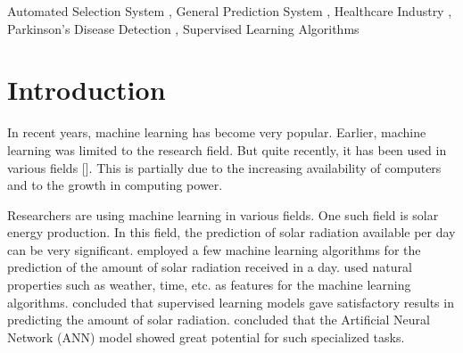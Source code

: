 \documentclass[a4paper,fleqn]{cas-dc}
\begin{document}


\begin{keywords}
    Automated Selection System \sep
    General Prediction System \sep
    Healthcare Industry \sep
    Parkinson's Disease Detection \sep
    Supervised Learning Algorithms
\end{keywords}


\maketitle



\section{Introduction}\label{sec:introduciton}

In recent years, machine learning has become very popular. Earlier, machine learning was limited to the research field. But quite recently, it has been used in various fields []. This is partially due to the increasing availability of computers and to the growth in computing power.

Researchers are using machine learning in various fields. One such field is solar energy production. In this field, the prediction of solar radiation available per day can be very significant. \cite*{ref_paper_7} employed a few machine learning algorithms for the prediction of the amount of solar radiation received in a day. \citeauthor{ref_paper_7} used natural properties such as weather, time, etc. as features for the machine learning algorithms. \citeauthor{ref_paper_7} concluded that supervised learning models gave satisfactory results in predicting the amount of solar radiation. \citeauthor{ref_paper_7} concluded that the Artificial Neural Network (ANN) model showed great potential for such specialized tasks.
\end{document}
